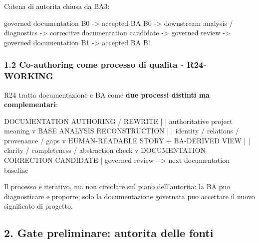 \documentclass[
  9pt,
  a4paper,
]{article}
\newenvironment{Shaded}{}{}
\newcommand{\NormalTok}[1]{#1}
\begin{document}
Catena di autorita chiusa da BA3:

\begin{Shaded}
\begin{Highlighting}[]
\NormalTok{governed documentation B0}
\NormalTok{  {-}\textgreater{} accepted BA B0}
\NormalTok{  {-}\textgreater{} downstream analysis / diagnostics}
\NormalTok{  {-}\textgreater{} corrective documentation candidate}
\NormalTok{  {-}\textgreater{} governed review}
\NormalTok{  {-}\textgreater{} governed documentation B1}
\NormalTok{  {-}\textgreater{} accepted BA B1}
\end{Highlighting}
\end{Shaded}

\subsubsection{1.2 Co-authoring come processo di qualita -
R24-WORKING}\label{co-authoring-come-processo-di-qualita---r24-working}

R24 tratta documentazione e BA come \textbf{due processi distinti ma
complementari}:

\begin{Shaded}
\begin{Highlighting}[]
\NormalTok{DOCUMENTATION AUTHORING / REWRITE}
\NormalTok{        |}
\NormalTok{        | authoritative project meaning}
\NormalTok{        v}
\NormalTok{BASE ANALYSIS RECONSTRUCTION}
\NormalTok{        |}
\NormalTok{        | identity / relations / provenance / gaps}
\NormalTok{        v}
\NormalTok{HUMAN{-}READABLE STORY + BA{-}DERIVED VIEW}
\NormalTok{        |}
\NormalTok{        | clarity / completeness / abstraction check}
\NormalTok{        v}
\NormalTok{DOCUMENTATION CORRECTION CANDIDATE}
\NormalTok{        |}
\NormalTok{        \textasciigrave{}{-}{-} governed review {-}{-}\textgreater{} next documentation baseline}
\end{Highlighting}
\end{Shaded}

Il processo e iterativo, ma non circolare sul piano dell'autorita: la BA
puo diagnosticare e proporre; solo la documentazione governata puo
accettare il nuovo significato di progetto.

\subsection{2. Gate preliminare: autorita delle
fonti}\label{gate-preliminare-autorita-delle-fonti}
\end{document}
